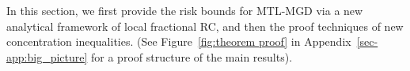 \documentclass{article}
\def\vx{{\mathbf{x}}}
\def\mX{{\mathbf{X}}}
\def\eE{\mathbb{E}}
\begin{document}
In this section, we first provide the risk bounds for MTL-MGD via a new analytical framework of local fractional RC, and then the proof techniques of new concentration inequalities. (See Figure~\ref{fig:theorem proof} in Appendix~\ref{sec-app:big_picture} for a proof structure of the main results).

\end{document}
